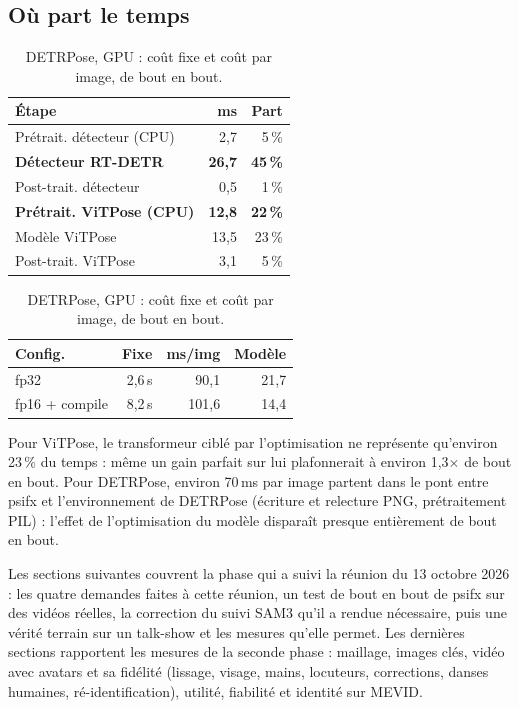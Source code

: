 \documentclass[11pt,a4paper]{report}
\begin{document}
\subsection{Où part le temps}

\begin{table}[H]
\centering
\begin{minipage}[t]{0.48\textwidth}
\centering
\caption{ViTPose fp32 : temps par étape (ms/image).}
\label{tab:vitpose-profil}
\small
\begin{tabular}{@{}lrr@{}}
\toprule
Étape & ms & Part \\
\midrule
Prétrait. détecteur (CPU) & 2,7 & 5\,\% \\
\textbf{Détecteur RT-DETR} & \textbf{26,7} & \textbf{45\,\%} \\
Post-trait. détecteur & 0,5 & 1\,\% \\
\textbf{Prétrait. ViTPose (CPU)} & \textbf{12,8} & \textbf{22\,\%} \\
Modèle ViTPose & 13,5 & 23\,\% \\
Post-trait. ViTPose & 3,1 & 5\,\% \\
\bottomrule
\end{tabular}
\end{minipage}
\hfill
\begin{minipage}[t]{0.48\textwidth}
\centering
\caption{DETRPose, GPU : coût fixe et coût par image, de bout en bout.}
\label{tab:detrpose-pont}
\small
\begin{tabular}{@{}lrrr@{}}
\toprule
Config. & Fixe & ms/img & Modèle \\
\midrule
fp32 & 2,6\,s & 90,1 & 21,7 \\
fp16 + compile & 8,2\,s & 101,6 & 14,4 \\
\bottomrule
\end{tabular}
\end{minipage}
\end{table}

Pour ViTPose, le transformeur ciblé par l'optimisation ne représente qu'environ 23\,\% du temps : même un gain
parfait sur lui plafonnerait à environ 1,3$\times$ de bout en bout. Pour DETRPose, environ 70\,ms par image partent
dans le pont entre psifx et l'environnement de DETRPose (écriture et relecture PNG, prétraitement PIL) : l'effet
de l'optimisation du modèle disparaît presque entièrement de bout en bout.

Les sections suivantes couvrent la phase qui a suivi la réunion du 13 octobre 2026 : les quatre demandes faites à cette réunion,
un test de bout en bout de psifx sur des vidéos réelles, la correction du suivi SAM3 qu'il a rendue nécessaire, puis une vérité
terrain sur un talk-show et les mesures qu'elle permet. Les dernières sections rapportent les mesures de la seconde phase : maillage,
images clés, vidéo avec avatars et sa fidélité (lissage, visage, mains, locuteurs, corrections, danses humaines, ré-identification),
utilité, fiabilité et identité sur MEVID.
\end{document}
